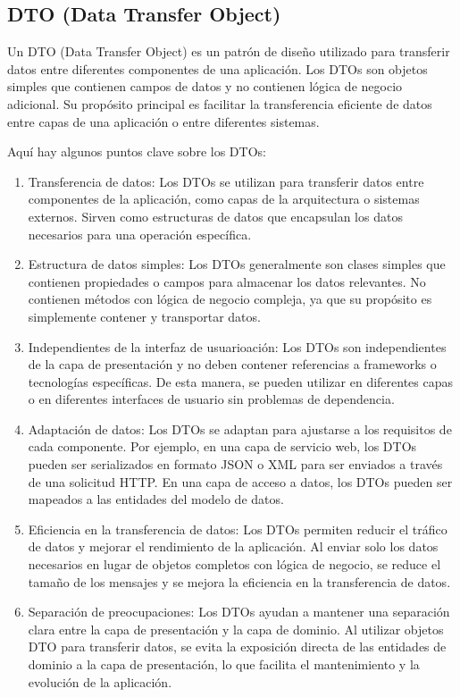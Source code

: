 \documentclass[executivepaper]{article}
\begin{document}
\subsection{DTO (Data Transfer Object)}

Un DTO (Data Transfer Object) es un patrón de diseño utilizado para transferir datos entre diferentes componentes de una aplicación. Los DTOs son objetos simples que contienen campos de datos y no contienen lógica de negocio adicional. Su propósito principal es facilitar la transferencia eficiente de datos entre capas de una aplicación o entre diferentes sistemas.

Aquí hay algunos puntos clave sobre los DTOs:

\begin{enumerate}
    \item Transferencia de datos: Los DTOs se utilizan para transferir datos entre componentes de la aplicación, como capas de la arquitectura o sistemas externos. Sirven como estructuras de datos que encapsulan los datos necesarios para una operación específica.
    \item Estructura de datos simples: Los DTOs generalmente son clases simples que contienen propiedades o campos para almacenar los datos relevantes. No contienen métodos con lógica de negocio compleja, ya que su propósito es simplemente contener y transportar datos.
    \item Independientes de la interfaz de usuarioación: Los DTOs son independientes de la capa de presentación y no deben contener referencias a frameworks o tecnologías específicas. De esta manera, se pueden utilizar en diferentes capas o en diferentes interfaces de usuario sin problemas de dependencia.
    \item Adaptación de datos: Los DTOs se adaptan para ajustarse a los requisitos de cada componente. Por ejemplo, en una capa de servicio web, los DTOs pueden ser serializados en formato JSON o XML para ser enviados a través de una solicitud HTTP. En una capa de acceso a datos, los DTOs pueden ser mapeados a las entidades del modelo de datos.
    \item Eficiencia en la transferencia de datos: Los DTOs permiten reducir el tráfico de datos y mejorar el rendimiento de la aplicación. Al enviar solo los datos necesarios en lugar de objetos completos con lógica de negocio, se reduce el tamaño de los mensajes y se mejora la eficiencia en la transferencia de datos.
    \item Separación de preocupaciones: Los DTOs ayudan a mantener una separación clara entre la capa de presentación y la capa de dominio. Al utilizar objetos DTO para transferir datos, se evita la exposición directa de las entidades de dominio a la capa de presentación, lo que facilita el mantenimiento y la evolución de la aplicación.
\end{enumerate}
\end{document}
